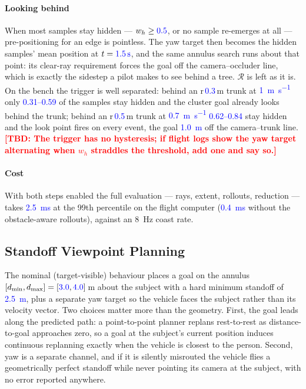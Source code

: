 \documentclass[conference]{IEEEtran}
\newcommand{\tbd}[1]{\textcolor{red}{\textbf{[TBD: #1]}}}
\newcommand{\bench}[1]{\textcolor{blue}{#1}}
\begin{document}
\paragraph{Looking behind} When most samples stay hidden --- $w_h\geq\bench{0.5}$, or
no sample re-emerges at all --- pre-positioning for an edge is pointless. The yaw
target then becomes the hidden samples' mean position at $t=\bench{\SI{1.5}{\second}}$,
and the same annulus search runs about that point: its clear-ray requirement
forces the goal off the camera--occluder line, which is exactly the sidestep a
pilot makes to see behind a tree. $\mathcal{R}$ is left as it is. On the bench the
trigger is well separated: behind an r\,\bench{0.3}\,m trunk at \bench{\SI{1}{\meter\per\second}}
only \bench{0.31--0.59} of the samples stay hidden and the cluster goal already looks
behind the trunk; behind an r\,\bench{0.5}\,m trunk at \bench{\SI{0.7}{\meter\per\second}}
\bench{0.62--0.84} stay hidden and the look point fires on every event, the goal
\bench{\SI{1.0}{\meter}} off the camera--trunk line. \tbd{The trigger has no hysteresis; if
flight logs show the yaw target alternating when $w_h$ straddles the threshold,
add one and say so.}

\paragraph{Cost} With both steps enabled the full evaluation --- rays, extent,
rollouts, reduction --- takes \bench{\SI{2.5}{\milli\second}} at the 99th percentile on the
flight computer (\bench{\SI{0.4}{\milli\second}} without the obstacle-aware rollouts),
against an \SI{8}{\hertz} coast rate.

\subsection{Standoff Viewpoint Planning}
\label{sec:viewpoint}
The nominal (target-visible) behaviour places a goal on the annulus
$[d_{\min}, d_{\max}] = [\bench{3.0}, \bench{4.0}]$\,m about the subject with a
hard minimum standoff of \bench{\SI{2.5}{\meter}}, plus a separate yaw target so
the vehicle faces the subject rather than its velocity vector. Two choices matter
more than the geometry. First, the goal leads along the predicted path: a
point-to-point planner replans rest-to-rest as distance-to-goal approaches zero,
so a goal at the subject's current position induces continuous replanning exactly
when the vehicle is closest to the person. Second, yaw is a separate channel, and
if it is silently misrouted the vehicle flies a geometrically perfect standoff
while never pointing its camera at the subject, with no error reported anywhere.
\end{document}
